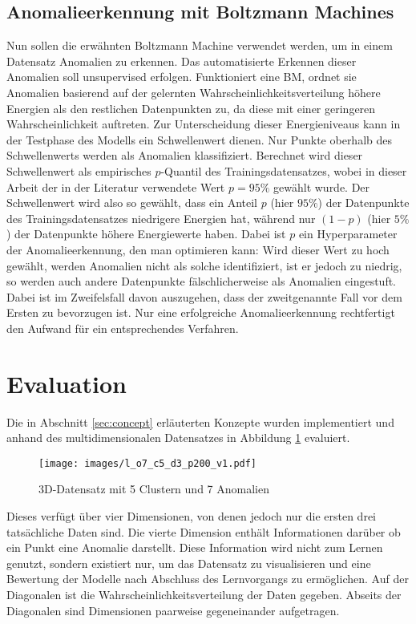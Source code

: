 \subsection{Anomalieerkennung mit Boltzmann Machines}
\label{subsec:anomaly-detec-bm}
Nun sollen die erwähnten Boltzmann Machine verwendet werden, um in einem Datensatz Anomalien zu erkennen. 
Das automatisierte Erkennen dieser Anomalien soll unsupervised erfolgen. Funktioniert eine BM, ordnet sie Anomalien basierend auf der gelernten Wahrscheinlichkeitsverteilung höhere Energien als den restlichen Datenpunkten zu, da diese mit einer geringeren Wahrscheinlichkeit auftreten. Zur Unterscheidung dieser Energieniveaus kann in der Testphase des Modells ein Schwellenwert dienen. Nur Punkte oberhalb des Schwellenwerts werden als Anomalien klassifiziert. Berechnet wird dieser Schwellenwert als empirisches $p$-Quantil des Trainingsdatensatzes, wobei in dieser Arbeit der in der Literatur verwendete Wert $p = 95\%$ gewählt wurde. Der Schwellenwert wird also so gewählt, dass ein Anteil $p$ (hier $95\%$) der Datenpunkte des Trainingsdatensatzes niedrigere Energien hat, während nur $(1 - p)$ (hier $5\%$) der Datenpunkte höhere Energiewerte haben. Dabei ist $p$ ein Hyperparameter der Anomalieerkennung, den man optimieren kann: Wird dieser Wert zu hoch gewählt, werden Anomalien nicht als solche identifiziert, ist er jedoch zu niedrig, so werden auch andere Datenpunkte fälschlicherweise als Anomalien eingestuft. Dabei ist im Zweifelsfall davon auszugehen, dass der zweitgenannte Fall vor dem Ersten zu bevorzugen ist. Nur eine erfolgreiche Anomalieerkennung rechtfertigt den Aufwand für ein entsprechendes Verfahren.~\cite{do2018energy, zhai2016deep}

\section{Evaluation} 
\label{sec:evaluation}

Die in Abschnitt \ref{sec:concept} erläuterten Konzepte wurden implementiert und anhand des multidimensionalen Datensatzes in
Abbildung \ref{fig:dataset} evaluiert.

\begin{figure}[h!]
    \centering
    \texttt{[image: images/l\_o7\_c5\_d3\_p200\_v1.pdf]}
    \caption{3D-Datensatz mit 5 Clustern und 7 Anomalien}
    \label{fig:dataset}
\end{figure}

\noindent Dieses verfügt über vier Dimensionen, von denen jedoch nur die ersten drei tatsächliche Daten sind. Die vierte Dimension
enthält Informationen darüber ob ein Punkt eine Anomalie darstellt. Diese Information wird nicht zum Lernen genutzt, sondern
existiert nur, um das Datensatz zu visualisieren und eine Bewertung der Modelle nach Abschluss des Lernvorgangs zu ermöglichen.
Auf der Diagonalen ist die Wahrscheinlichkeitsverteilung der Daten gegeben.
Abseits der Diagonalen sind Dimensionen paarweise gegeneinander aufgetragen.

